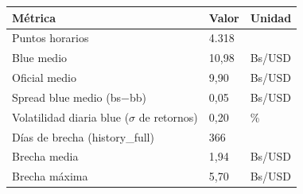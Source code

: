 \begin{tabular}{@{}lll@{}}
\toprule
Métrica & Valor & Unidad \\
\midrule
Puntos horarios & 4.318 &  \\
Blue medio & 10,98 & Bs/USD \\
Oficial medio & 9,90 & Bs/USD \\
Spread blue medio (bs$-$bb) & 0,05 & Bs/USD \\
Volatilidad diaria blue ($\sigma$ de retornos) & 0,20 & \% \\
Días de brecha (history\_full) & 366 &  \\
Brecha media & 1,94 & Bs/USD \\
Brecha máxima & 5,70 & Bs/USD \\
\bottomrule
\end{tabular}
